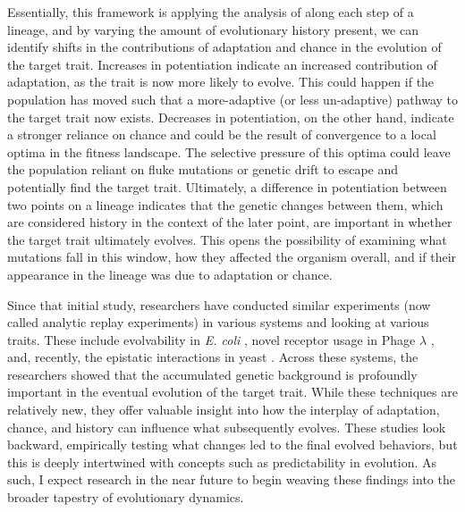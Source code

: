 Essentially, this framework is applying the analysis of \citet{travisanoExperimentalTestsRoles1995} along each step of a lineage, and by varying the amount of evolutionary history present, we can identify shifts in the contributions of adaptation and chance in the evolution of the target trait.
Increases in potentiation indicate an increased contribution of adaptation, as the trait is now more likely to evolve. 
This could happen if the population has moved such that a more-adaptive (or less un-adaptive) pathway to the target trait now exists. 
Decreases in potentiation, on the other hand, indicate a stronger reliance on chance and could be the result of convergence to a local optima in the fitness landscape.
The selective pressure of this optima could leave the population reliant on fluke mutations or genetic drift to escape and potentially find the target trait.
Ultimately, a difference in potentiation between two points on a lineage indicates that the genetic changes between them, which are considered history in the context of the later point, are important in whether the target trait ultimately evolves.
This opens the possibility of examining what mutations fall in this window, how they affected the organism overall, and if their appearance in the lineage was due to adaptation or chance.


Since that initial study, researchers have conducted similar experiments (now called analytic replay experiments) in various systems and looking at various traits. 
These include evolvability in \textit{E. coli} \citep{woodsSecondorderSelectionEvolvability2011}, novel receptor usage in Phage $\lambda$ \citep{meyerRepeatabilityContingencyEvolution2012}, and, recently, the epistatic interactions in yeast \citep{vignognaExploringLocalGenetic2021}.
Across these systems, the researchers showed that the accumulated genetic background is profoundly important in the eventual evolution of the target trait. 
While these techniques are relatively new, they offer valuable insight into how the interplay of adaptation, chance, and history can influence what subsequently evolves. 
These studies look backward, empirically testing what changes led to the final evolved behaviors, but this is deeply intertwined with concepts such as predictability in evolution. 
As such, I expect research in the near future to begin weaving these findings into the broader tapestry of evolutionary dynamics.

